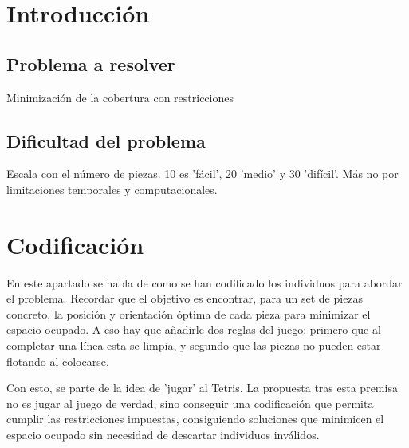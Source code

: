 \documentclass[11pt,spanish,listoffigures,listoftables]{tfgetsinf}
\begin{document}


\chapter{Introducción}

\section{Problema a resolver}
Minimización de la cobertura con restricciones 

\section{Dificultad del problema}
Escala con el número de piezas. 10 es 'fácil', 20 'medio' y 30 'difícil'. Más no por limitaciones temporales y computacionales.

\mainmatter

\chapter{Codificación}
En este apartado se habla de como se han codificado los individuos para abordar el problema. Recordar que el objetivo es encontrar, para un set de piezas concreto, la posición y orientación óptima de cada pieza para minimizar el espacio ocupado. A eso hay que añadirle dos reglas del juego: primero que al completar una línea esta se limpia, y segundo que las piezas no pueden estar flotando al colocarse.

Con esto, se parte de la idea de 'jugar' al Tetris. La propuesta tras esta premisa no es jugar al juego de verdad, sino conseguir una codificación que permita cumplir las restricciones impuestas, consiguiendo soluciones que minimicen el espacio ocupado sin necesidad de descartar individuos inválidos. 
\end{document}
